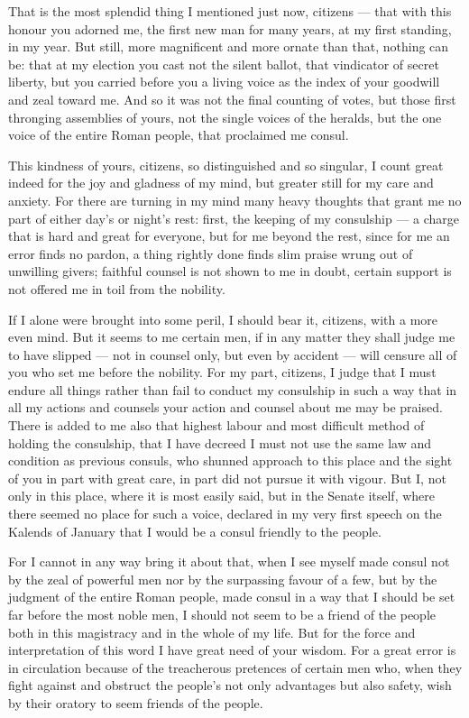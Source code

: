  That is the most splendid thing I mentioned just now, citizens --- that with this honour you adorned me, the first new man for many years, at my first standing, in my year. But still, more magnificent and more ornate than that, nothing can be: that at my election you cast not the silent ballot, that vindicator of secret liberty, but you carried before you a living voice as the index of your goodwill and zeal toward me. And so it was not the final counting of votes, but those first thronging assemblies of yours, not the single voices of the heralds, but the one voice of the entire Roman people, that proclaimed me consul.

 This kindness of yours, citizens, so distinguished and so singular, I count great indeed for the joy and gladness of my mind, but greater still for my care and anxiety. For there are turning in my mind many heavy thoughts that grant me no part of either day's or night's rest: first, the keeping of my consulship --- a charge that is hard and great for everyone, but for me beyond the rest, since for me an error finds no pardon, a thing rightly done finds slim praise wrung out of unwilling givers; faithful counsel is not shown to me in doubt, certain support is not offered me in toil from the nobility.

 If I alone were brought into some peril, I should bear it, citizens, with a more even mind. But it seems to me certain men, if in any matter they shall judge me to have slipped --- not in counsel only, but even by accident --- will censure all of you who set me before the nobility. For my part, citizens, I judge that I must endure all things rather than fail to conduct my consulship in such a way that in all my actions and counsels your action and counsel about me may be praised. There is added to me also that highest labour and most difficult method of holding the consulship, that I have decreed I must not use the same law and condition as previous consuls, who shunned approach to this place and the sight of you in part with great care, in part did not pursue it with vigour. But I, not only in this place, where it is most easily said, but in the Senate itself, where there seemed no place for such a voice, declared in my very first speech on the Kalends of January that I would be a consul friendly to the people.

 For I cannot in any way bring it about that, when I see myself made consul not by the zeal of powerful men nor by the surpassing favour of a few, but by the judgment of the entire Roman people, made consul in a way that I should be set far before the most noble men, I should not seem to be a friend of the people both in this magistracy and in the whole of my life. But for the force and interpretation of this word I have great need of your wisdom. For a great error is in circulation because of the treacherous pretences of certain men who, when they fight against and obstruct the people's not only advantages but also safety, wish by their oratory to seem friends of the people.


